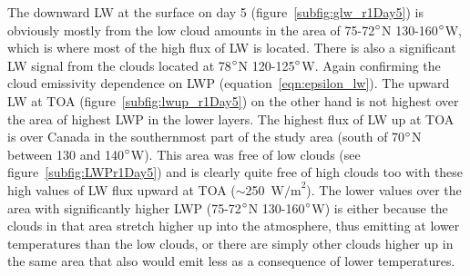 The downward LW at the surface on day 5 (figure~\ref{subfig:glw_r1Day5}) is obviously mostly from the low cloud amounts in the area of 75-72$\degree$N 130-160$\degree$W, which is where most of the high flux of LW is located. There is also a significant LW signal from the clouds located at 78$\degree$N 120-125$\degree$W. Again confirming the cloud emissivity dependence on LWP (equation~\ref{eqn:epsilon_lw}). The upward LW at TOA (figure~\ref{subfig:lwup_r1Day5}) on the other hand is not highest over the area of highest LWP in the lower layers. The highest flux of LW up at TOA is over Canada in the southernmost part of the study area (south of 70$\degree$N between 130 and 140$\degree$W). This area was free of low clouds (see figure~\ref{subfig:LWPr1Day5}) and is clearly quite free of high clouds too with these high values of LW flux upward at TOA ($\sim$250~$\text{W/m}^2$). The lower values over the area with significantly higher LWP (75-72$\degree$N 130-160$\degree$W) is either because the clouds in that area stretch higher up into the atmosphere, thus emitting at lower temperatures than the low clouds, or there are simply other clouds higher up in the same area that also would emit less as a consequence of lower temperatures.

